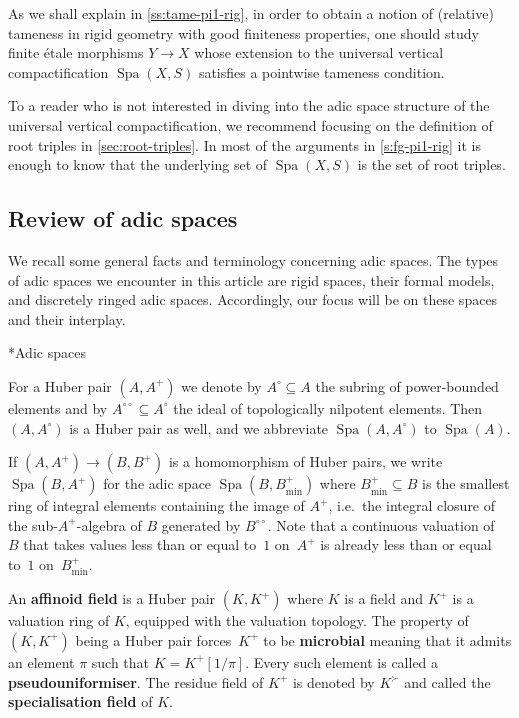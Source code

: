 \documentclass[a4paper,twoside,11pt,reqno]{amsart}
\makeatletter
\DeclareMathOperator{\Spa}{Spa}
\def\subsubsection{\@startsection{subsubsection}{3}%
      \z@{.5\linespacing\@plus.7\linespacing}{-.5em}%
      {\normalfont\bfseries}}
\theoremstyle{definition}
\numberwithin{equation}{subsection}
\makeatother
\begin{document}
As we shall explain in \cref{ss:tame-pi1-rig}, in order to obtain a notion of (relative) tameness in rigid geometry with good finiteness properties, one should study finite \'etale morphisms $Y \to X$ whose extension to the universal vertical compactification $\Spa(X,S)$ satisfies a pointwise tameness condition. 

To a reader who is not interested in diving into the adic space structure of the universal vertical compactification, we recommend focusing on the definition of root triples in \cref{sec:root-triples}.
In most of the arguments in \cref{s:fg-pi1-rig} it is enough to know that the underlying set of $\Spa(X,S)$ is the set of root triples.


\subsection{Review of adic spaces}
\label{ss:adic-spaces}


We recall some general facts and terminology concerning adic spaces.
The types of adic spaces we encounter in this article are rigid spaces, their formal models, and discretely ringed adic spaces.
Accordingly, our focus will be on these spaces and their interplay.

\subsubsection*{Adic spaces}

For a Huber pair $(A, A^+)$ we denote by $A^\circ\subseteq A$ the subring of power-bounded elements and by $A^{\circ\circ}\subseteq A^\circ$ the ideal of topologically nilpotent elements. Then $(A, A^\circ)$ is a Huber pair as well, and we abbreviate $\Spa(A, A^\circ)$ to $\Spa(A)$.

If $(A, A^+)\to (B, B^+)$ is a homomorphism of Huber pairs, we write $\Spa(B, A^+)$ for the adic space $\Spa(B, B^+_{\min})$ where $B^+_{\min}\subseteq B$ is the smallest ring of integral elements containing the image of $A^+$, i.e.\ the integral closure of the sub-$A^+$-algebra of $B$ generated by $B^{\circ\circ}$.
Note that a continuous valuation of~$B$ that takes values less than or equal to~$1$ on~$A^+$ is already less than or equal to~$1$ on~$B^+_{\min}$.

An {\bf affinoid field} is a Huber pair $(K, K^+)$ where $K$ is a field and $K^+$ is a valuation ring of $K$, equipped with the valuation topology.
The property of $(K,K^+)$ being a Huber pair forces~$K^+$ to be {\bf microbial} meaning that it admits an element $\pi$ such that $K = K^+[1/\pi]$.
Every such element is called a {\bf pseudouniformiser}.
The residue field of $K^+$ is denoted by $K^\succ$ and called the {\bf specialisation field} of $K$. 
\end{document}
